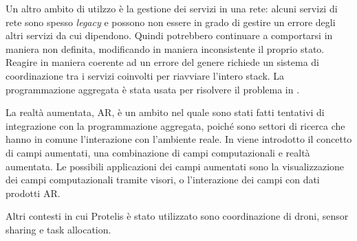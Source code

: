 Un altro ambito di utilzzo è la gestione dei servizi in una rete:
alcuni servizi di rete sono spesso \textit{legacy} e possono non essere in
grado di gestire un errore degli altri servizi da cui dipendono. Quindi
potrebbero continuare a comportarsi in maniera non definita, modificando in
maniera inconsistente il proprio stato. Reagire in maniera coerente ad un errore
del genere richiede un sistema di coordinazione tra i servizi coinvolti per
riavviare l'intero stack. La programmazione aggregata è stata usata per
risolvere il problema in \cite{7306601}.

La realtà aumentata, AR, è un ambito nel quale sono stati fatti tentativi di
integrazione con la programmazione aggregata, poiché sono settori di ricerca che
hanno in comune l'interazione con l'ambiente reale. In \cite{7306561} viene
introdotto il concetto di campi aumentati, una combinazione di campi
computazionali e realtà aumentata. Le possibili applicazioni dei campi aumentati
sono la visualizzazione dei campi computazionali tramite visori, o l'interazione
dei campi con dati prodotti AR.

Altri contesti in cui Protelis è stato utilizzato sono coordinazione di
droni\cite{7789463}, sensor sharing\cite{Beal:2018:AOA:3208359.3179994} e task
allocation\cite{8791999}.

